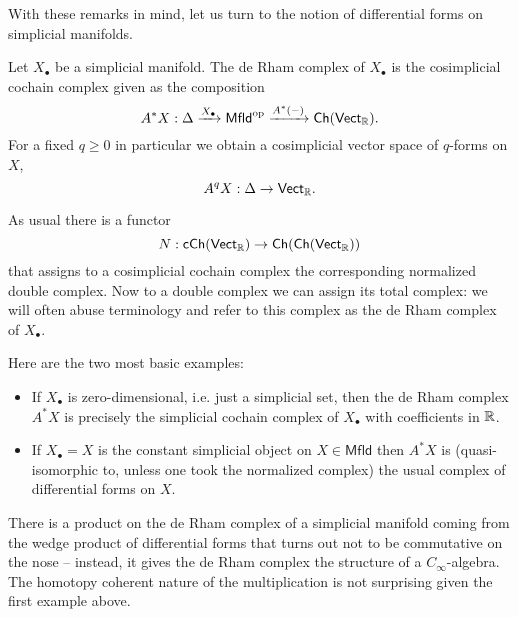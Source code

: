 \documentclass{amsart}
\begin{document}
With these remarks in mind, let us turn to the notion of differential forms on 
simplicial manifolds. 
\begin{definition}
    Let $X_\bullet$ be a simplicial manifold. The de Rham complex of $X_\bullet$ 
    is the cosimplicial cochain complex given as the composition
    \begin{equation*}
        A^*X : \Delta \xrightarrow{X_\bullet} \mathsf{Mfld}^{\text{op}}
        \xrightarrow{A^*(-)} \mathsf{Ch}(\mathsf{Vect}_{\mathbb{R}}).
    \end{equation*}
    For a fixed $q\geq 0$ in particular we obtain a cosimplicial vector space of
    $q$-forms on $X$,
    \begin{equation*}
        A^qX : \Delta \to \mathsf{Vect}_{\mathbb{R}}.
    \end{equation*}
\end{definition}

As usual there is a functor
\begin{equation*}
    N: \mathsf{cCh(Vect_{\mathbb{R}})} \to \mathsf{Ch(Ch(Vect_{\mathbb{R}}))}
\end{equation*}
that assigns to a cosimplicial cochain complex the corresponding normalized
double complex. Now to a double 
complex we can assign its total complex: we will often abuse terminology and 
refer to this complex as the de Rham complex of $X_\bullet$.

\begin{example}
    Here are the two most basic examples:
    \begin{itemize}
        \item If $X_\bullet$ is zero-dimensional, i.e. just a simplicial set,
            then the 
            de Rham complex $A^*X$ is precisely the simplicial cochain complex
            of $X_\bullet$ with coefficients in $\mathbb{R}$.
        \item If $X_\bullet=X$ is the constant simplicial object on $X\in 
            \mathsf{Mfld}$ then $A^*X$ is (quasi-isomorphic to, unless one took
            the normalized complex) the usual complex of differential forms on
            $X$.
    \end{itemize}
\end{example}

\begin{remark}
    There is a product on the de Rham complex of a simplicial manifold
    coming from the wedge product of differential forms that 
    turns out not to be commutative on the nose -- instead, it gives the de
    Rham complex the structure of a $C_\infty$-algebra. The homotopy coherent 
    nature of the multiplication is not surprising given the first example 
    above.
\end{remark}
\end{document}
